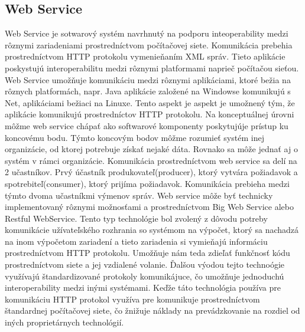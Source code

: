 \subsection{Web Service}
Web Service  je sotwarový systém navrhnutý na podporu inteoperability medzi rôznymi zariadeniami prostredníctvom počítačovej siete. Komunikácia prebehia prostredníctvom HTTP protokolu vymenieňaním XML správ. Tieto aplikácie poskystujú interoperabilitu medzi rôznymi platformami naprieč počítačou sieťou. Web Service umožňuje komunikáciu medzi rôznymi aplikáciami, ktoré bežia na rôznych platformách, napr. Java aplikácie založené na Windowse komunikujú s Net, aplikáciami bežiaci na Linuxe. Tento aspekt je aspekt je umožnený tým, že aplikácie komunikujú prostredníctov HTTP protokolu. Na konceptuálnej úrovni môžme web service chápať ako softwarové komponenty poskytujúje prístup ku koncovému bodu. Týmto koncovým bodov môžme rozumieť systém inej organizácie, od ktorej potrebuje získať nejaké dáta. Rovnako sa môže jednať aj o systém v rámci organizácie. Komunikácia prostredníctvom web service sa delí na 2 učastníkov. Prvý účastník produkovateľ(producer), ktorý vytvára požiadavok a spotrebiteľ(consumer), ktorý prijíma požiadavok. Komunikácia prebieha medzi týmto dvoma učastníkmi výmenov správ. Web service môže byť technicky implementovaný rôznymi možnosťami a prostredníctvom Big Web Service alebo Restful WebService. Tento typ technológie bol zvolený z dôvodu potreby komunikácie užívateľského rozhrania so systémom na výpočet, ktorý sa nachadzá na inom výpočetom zariadení a tieto zariadenia si vymieňajú informáciu prostredníctvom HTTP protokolu. Umožňuje nám teda zdieľať funkčnosť kódu prostredníctvom siete a jej vzdialené volanie. Ďalšou výodou tejto technoógie využívajú štandardizované protokoly komunikájuce, čo umožňuje jednoduchú interoperability medzi inými systémami. Keďže táto technológia používa pre komunikáciu HTTP protokol využíva pre komunikuje prostredníctvom štandardnej počítačovej siete, čo žnižuje náklady na prevádzkovanie na rozdiel od iných proprietárnych technológií.

